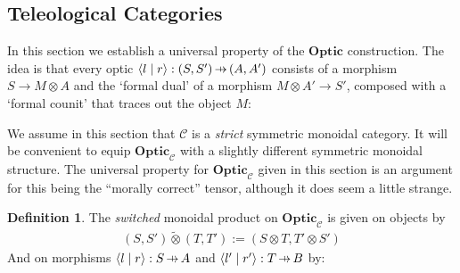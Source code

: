 \documentclass[11pt,a4paper]{article}
\theoremstyle{plain}
\theoremstyle{definition}
\newtheorem{definition}[theorem]{Definition}
\newcommand{\C}{\mathscr{C}}
\newcommand{\Optic}{\mathbf{Optic}}
\newcommand{\switched}{\mathbin{\tilde{\otimes}}}
\newcommand{\rep}[2]{{\ensuremath \left\langle #1 \mid #2 \right\rangle}}
\newcommand{\hto}{\ensuremath{\,\mathaccent\shortmid\rightarrow\,}}
\begin{document}
\subsection{Teleological Categories}
\label{teleological-categories}

In this section we establish a universal property of the $\Optic$ construction. The idea is that every optic $\rep{l}{r} : (S, S') \hto (A, A')$ consists of a morphism $S \to M \otimes A$ and the `formal dual' of a morphism $M \otimes A' \to S'$, composed with a `formal counit' that traces out the object $M$:
\begin{center}
  
\end{center}

We assume in this section that $\C$ is a \emph{strict} symmetric monoidal category. It will be convenient to equip $\Optic_\C$ with a slightly different symmetric monoidal structure. The universal property for $\Optic_\C$ given in this section is an argument for this being the ``morally correct'' tensor, although it does seem a little strange.

\begin{definition}
  The \emph{switched} monoidal product on $\Optic_\C$ is given on objects by
  \begin{align*}
    (S, S') \switched (T, T') := (S \otimes T, T' \otimes S')
  \end{align*}
  And on morphisms $\rep{l}{r} : S \hto A$ and $\rep{l'}{r'} : T \hto B$ by:
  \begin{center}
    
  \end{center}
\end{definition}
\end{document}

